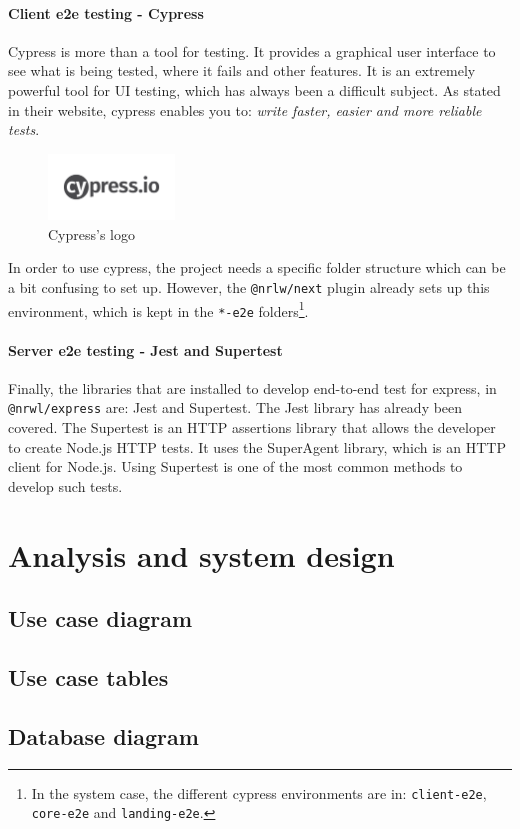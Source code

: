 \documentclass[a4paper, 12pt, oneside]{book}
\begin{document}
\subsubsection{Client e2e testing - Cypress}
Cypress is more than a tool for testing. It provides a graphical user interface to see what is being tested, where it fails and other features. It is an extremely powerful tool for UI testing, which has always been a difficult subject. As stated in their website, cypress enables you to: \emph{write faster, easier and more reliable tests}.
\begin{figure}[H]
	\centering
	\includegraphics[width=0.3\textwidth]{assets/cypress-logo.png}
	\caption{Cypress's logo}
\end{figure}
In order to use cypress, the project needs a specific folder structure which can be a bit confusing to set up. However, the \texttt{@nrlw/next} plugin already sets up this environment, which is kept in the \texttt{*-e2e} folders\footnote{In the system case, the different cypress environments are in: \texttt{client-e2e}, \texttt{core-e2e} and \texttt{landing-e2e}.}.
\subsubsection{Server e2e testing - Jest and Supertest}
Finally, the libraries that are installed to develop end-to-end test for express, in \texttt{@nrwl/express} are: Jest and Supertest. The Jest library has already been covered. The Supertest is an HTTP assertions library that allows the developer to create Node.js HTTP tests. It uses the SuperAgent library, which is an HTTP client for Node.js. Using Supertest is one of the most common methods to develop such tests.
\chapter{Analysis and system design}
\section{Use case diagram}
\section{Use case tables}
\section{Database diagram}
\end{document}
